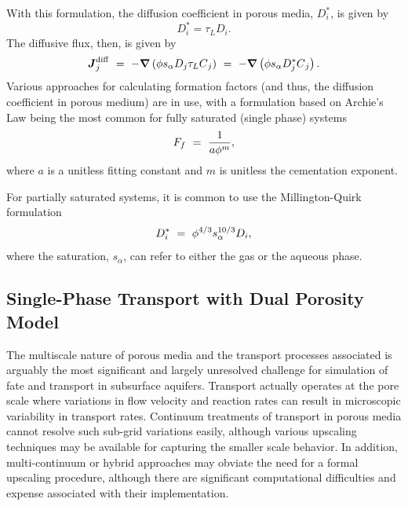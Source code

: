With this formulation, the diffusion coefficient in porous media, $D_{i}^{*}$, is given by
\begin{equation} \label{eq:EffectiveDiffusion)} 
  D_{i}^{*} =\tau_{L} D_{i}.  
\end{equation} 
The diffusive flux, then, is given by
\begin{equation} \label{eq:DiffusiveFluxPorousMedia)} 
  \boldsymbol{J}_{j}^{\rm diff} 
  \ =\  
  -\boldsymbol{\nabla} \left( \phi s_{\alpha} D_{j} \tau_{L} C{}_{j} \right) 
  \ =\  
  -\boldsymbol{\nabla} \left( \phi s_{\alpha} D_{j}^{*} C{}_{j} \right) .  
\end{equation} 
Various approaches for calculating formation factors (and thus, the diffusion coefficient in porous medium) are in use, 
with a formulation based on Archie's Law being the most common for fully saturated (single phase) systems
\begin{equation} \label{eq:CementationExponent} 
  F_f  \ =\  \frac{1}{a\phi ^{m} } ,  
\end{equation} 
where $a$ is a unitless fitting constant and $m$ is unitless the cementation exponent.  

For partially saturated systems, it is common to use the Millington-Quirk formulation 
\citep{millington1961permeability, sumner-handbook, moldrup2000predicting}
\begin{equation}   \label{eq:MillingtonQuirk}
  D_{i}^{*} \ =\  \phi^{4/3} s_{\alpha}^{10/3}  D_{i},
\end{equation}
where the saturation, $s_{\alpha}$, can refer to either the gas or the aqueous phase.







\subsection{Single-Phase Transport with Dual Porosity Model} 
\label{sec:transport-single-phase-dual-porosity}

The multiscale nature of porous media and the transport processes associated is 
arguably the most significant and largely unresolved challenge for simulation of 
fate and transport in subsurface aquifers.  
Transport actually operates at the pore scale where variations in flow velocity 
and reaction rates can result in microscopic variability in transport rates.  
Continuum treatments of transport in porous media cannot resolve such sub-grid 
variations easily, although various upscaling techniques may be available for 
capturing the smaller scale behavior.  
In addition, multi-continuum or hybrid approaches may obviate the need for a formal 
upscaling procedure, although there are significant computational difficulties and 
expense associated with their implementation.


